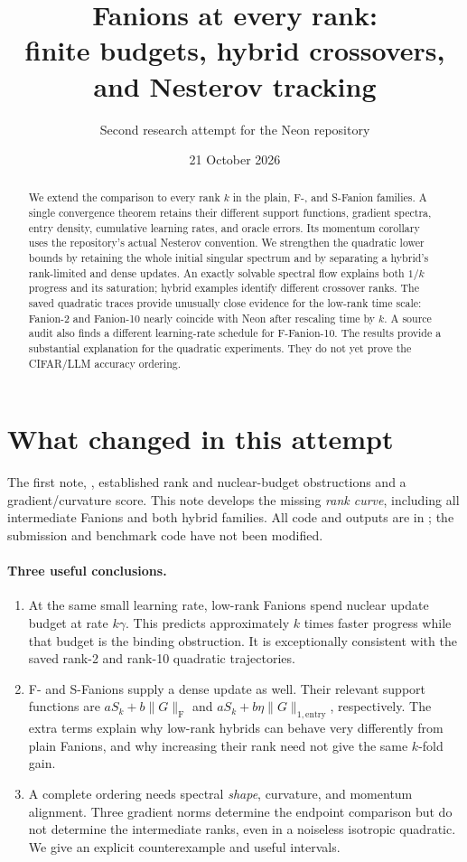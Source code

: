 \documentclass[11pt]{article}
\title{Fanions at every rank:\\finite budgets, hybrid crossovers, and Nesterov tracking}
\author{Second research attempt for the Neon repository}
\date{21 October 2026}
\newcommand{\F}[1]{\lVert #1\rVert_{\mathrm F}}
\newcommand{\ent}[1]{\lVert #1\rVert_{1,\mathrm{entry}}}
\begin{document}
\maketitle

\begin{abstract}
We extend the comparison to every rank $k$ in the plain, F-, and S-Fanion
families. A single convergence theorem retains their different support
functions, gradient spectra, entry density, cumulative learning rates, and
oracle errors. Its momentum corollary uses the repository's actual Nesterov
convention. We strengthen the quadratic lower bounds by retaining the whole
initial singular spectrum and by separating a hybrid's rank-limited and dense
updates. An exactly solvable spectral flow explains both $1/k$ progress and
its saturation; hybrid examples identify different crossover ranks.
The saved quadratic traces provide unusually close evidence for the low-rank
time scale: Fanion-2 and Fanion-10 nearly coincide with Neon after rescaling
time by $k$. A source audit also finds a different learning-rate schedule for
F-Fanion-10. The results provide a substantial explanation for the quadratic
experiments. They do not yet prove the CIFAR/LLM accuracy ordering.
\end{abstract}

\section{What changed in this attempt}

The first note, , established rank and nuclear-budget
obstructions and a gradient/curvature score. This note develops the missing
\emph{rank curve}, including all intermediate Fanions and both hybrid
families. All code and outputs are in ; the submission
and benchmark code have not been modified.

\paragraph{Three useful conclusions.}
\begin{enumerate}
\item At the same small learning rate, low-rank Fanions spend nuclear update
budget at rate $k\gamma$. This predicts approximately $k$ times faster
progress while that budget is the binding obstruction. It is exceptionally
consistent with the saved rank-2 and rank-10 quadratic trajectories.
\item F- and S-Fanions supply a dense update as well. Their relevant support
functions are $aS_k+b\F{G}$ and $aS_k+b\eta\ent{G}$, respectively. The extra
terms explain why low-rank hybrids can behave very differently from plain
Fanions, and why increasing their rank need not give the same $k$-fold gain.
\item A complete ordering needs spectral \emph{shape}, curvature, and
momentum alignment. Three gradient norms determine the endpoint comparison
but do not determine the intermediate ranks, even in a noiseless isotropic
quadratic. We give an explicit counterexample and useful intervals.
\end{enumerate}
\end{document}
